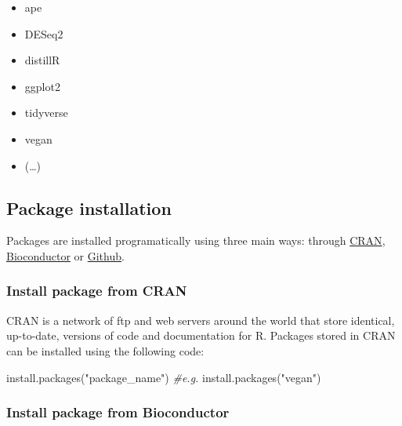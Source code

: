 \documentclass[
]{book}
\newenvironment{Shaded}{\begin{snugshade}}{\end{snugshade}}
\newcommand{\CommentTok}[1]{\textcolor[rgb]{0.56,0.35,0.01}{\textit{#1}}}
\newcommand{\FunctionTok}[1]{\textcolor[rgb]{0.00,0.00,0.00}{#1}}
\newcommand{\NormalTok}[1]{#1}
\newcommand{\StringTok}[1]{\textcolor[rgb]{0.31,0.60,0.02}{#1}}
\providecommand{\tightlist}{%
  \setlength{\itemsep}{0pt}\setlength{\parskip}{0pt}}
\begin{document}
\begin{itemize}
\tightlist
\item
  ape
\item
  DESeq2
\item
  distillR
\item
  ggplot2
\item
  tidyverse
\item
  vegan
\item
  (\ldots)
\end{itemize}

\hypertarget{package-installation}{%
\subsection*{Package installation}\label{package-installation}}

Packages are installed programatically using three main ways: through \href{https://cran.r-project.org/web/packages/available_packages_by_name.html}{CRAN}, \href{https://www.bioconductor.org/packages/release/bioc/}{Bioconductor} or \href{https://github.com/}{Github}.

\hypertarget{install-package-from-cran}{%
\subsubsection*{Install package from CRAN}\label{install-package-from-cran}}

CRAN is a network of ftp and web servers around the world that store identical, up-to-date, versions of code and documentation for R. Packages stored in CRAN can be installed using the following code:

\small

\begin{Shaded}
\begin{Highlighting}[]
\FunctionTok{install.packages}\NormalTok{(}\StringTok{"package\_name"}\NormalTok{)}
\CommentTok{\#e.g.}
\FunctionTok{install.packages}\NormalTok{(}\StringTok{"vegan"}\NormalTok{)}
\end{Highlighting}
\end{Shaded}

\normalsize

\hypertarget{install-package-from-bioconductor}{%
\subsubsection*{Install package from Bioconductor}\label{install-package-from-bioconductor}}
\end{document}
